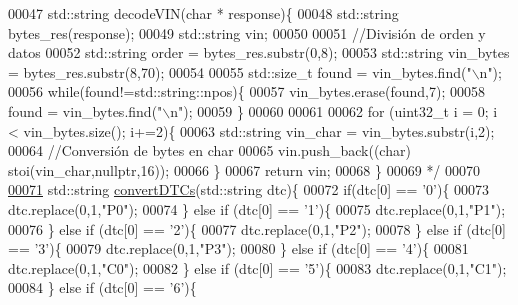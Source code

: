\begin{DoxyCode}
00047 \textcolor{comment}{std::string decodeVIN(char * response)\{}
00048 \textcolor{comment}{    std::string bytes\_res(response);}
00049 \textcolor{comment}{    std::string vin;}
00050 \textcolor{comment}{}
00051 \textcolor{comment}{    //División de orden y datos}
00052 \textcolor{comment}{    std::string order = bytes\_res.substr(0,8);}
00053 \textcolor{comment}{    std::string vin\_bytes = bytes\_res.substr(8,70);}
00054 \textcolor{comment}{}
00055 \textcolor{comment}{    std::size\_t found = vin\_bytes.find("\(\backslash\)n");}
00056 \textcolor{comment}{    while(found!=std::string::npos)\{}
00057 \textcolor{comment}{        vin\_bytes.erase(found,7);}
00058 \textcolor{comment}{        found = vin\_bytes.find("\(\backslash\)n");}
00059 \textcolor{comment}{    \}}
00060 \textcolor{comment}{}
00061 \textcolor{comment}{}
00062 \textcolor{comment}{    for (uint32\_t i = 0; i < vin\_bytes.size(); i+=2)\{}
00063 \textcolor{comment}{        std::string vin\_char = vin\_bytes.substr(i,2);}
00064 \textcolor{comment}{        //Conversión de bytes en char}
00065 \textcolor{comment}{        vin.push\_back((char) stoi(vin\_char,nullptr,16));}
00066 \textcolor{comment}{    \}}
00067 \textcolor{comment}{    return vin; }
00068 \textcolor{comment}{\}}
00069 \textcolor{comment}{*/}
00070 
\hyperlink{decoders_8hpp_a4f18f411252f4c60fae4af320989c262}{00071} std::string \hyperlink{decoders_8cpp_a4f18f411252f4c60fae4af320989c262}{convertDTCs}(std::string dtc)\{
00072     \textcolor{keywordflow}{if}(dtc[0] == \textcolor{charliteral}{'0'})\{
00073         dtc.replace(0,1,\textcolor{stringliteral}{"P0"});
00074     \} \textcolor{keywordflow}{else} \textcolor{keywordflow}{if} (dtc[0] == \textcolor{charliteral}{'1'})\{
00075         dtc.replace(0,1,\textcolor{stringliteral}{"P1"});
00076     \} \textcolor{keywordflow}{else} \textcolor{keywordflow}{if} (dtc[0] == \textcolor{charliteral}{'2'})\{
00077         dtc.replace(0,1,\textcolor{stringliteral}{"P2"});
00078     \} \textcolor{keywordflow}{else} \textcolor{keywordflow}{if} (dtc[0] == \textcolor{charliteral}{'3'})\{
00079         dtc.replace(0,1,\textcolor{stringliteral}{"P3"});
00080     \} \textcolor{keywordflow}{else} \textcolor{keywordflow}{if} (dtc[0] == \textcolor{charliteral}{'4'})\{
00081         dtc.replace(0,1,\textcolor{stringliteral}{"C0"});
00082     \} \textcolor{keywordflow}{else} \textcolor{keywordflow}{if} (dtc[0] == \textcolor{charliteral}{'5'})\{
00083         dtc.replace(0,1,\textcolor{stringliteral}{"C1"});
00084     \} \textcolor{keywordflow}{else} \textcolor{keywordflow}{if} (dtc[0] == \textcolor{charliteral}{'6'})\{

\end{DoxyCode}
